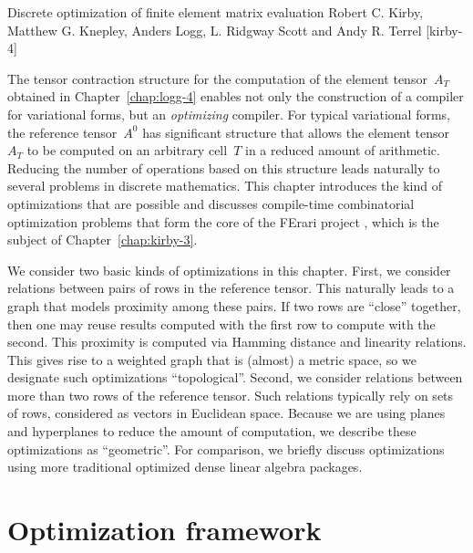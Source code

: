               {Discrete optimization of finite element matrix evaluation}
              {Robert C. Kirby, Matthew G. Knepley, Anders Logg, L. Ridgway Scott and Andy R. Terrel}
              {[kirby-4]}

\vspace{-0.5cm}

The tensor contraction structure for the computation of the element
tensor~$A_T$ obtained in Chapter~\ref{chap:logg-4} enables not only
the construction of a compiler for variational forms, but an
\emph{optimizing} compiler. For typical variational forms, the
reference tensor~$A^0$ has significant structure that allows the
element tensor~$A_T$ to be computed on an arbitrary cell~$T$ in a
reduced amount of arithmetic. Reducing the number of operations based
on this structure leads naturally to several problems in discrete
mathematics.  This chapter introduces the kind of optimizations that
are possible and discusses compile-time combinatorial optimization
problems that form the core of the FErari
project \citep{KirbyLoggScottEtAl2006,KirbyScott2007,KirbyLogg2008},
which is the subject of Chapter~\ref{chap:kirby-3}.

We consider two basic kinds of optimizations in this chapter. First,
we consider relations between pairs of rows in the reference tensor.
This naturally leads to a graph that models proximity among these
pairs.  If two rows are ``close'' together, then one may reuse results
computed with the first row to compute with the second. This proximity
is computed via Hamming distance and linearity relations.  This gives
rise to a weighted graph that is (almost) a metric space, so we
designate such optimizations ``topological''. Second, we consider
relations between more than two rows of the reference tensor. Such
relations typically rely on sets of rows, considered as vectors in
Euclidean space. Because we are using planes and hyperplanes to reduce
the amount of computation, we describe these optimizations as
``geometric''.  For comparison, we briefly discuss optimizations using
more traditional optimized dense linear algebra packages.

\section{Optimization framework}


